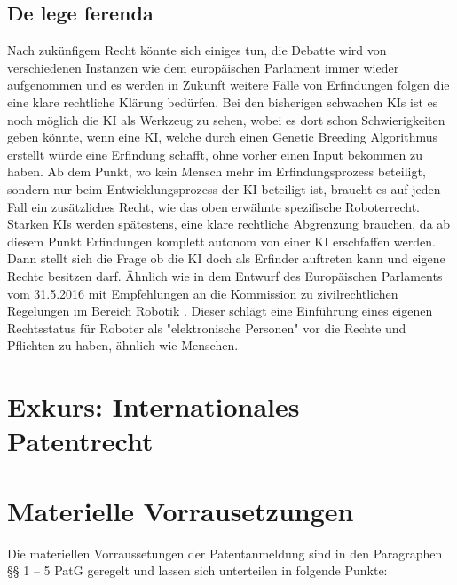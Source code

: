 \subsection{De lege ferenda}
Nach zukünfigem Recht könnte sich einiges tun, die Debatte wird von verschiedenen 
Instanzen wie dem europäischen Parlament immer wieder aufgenommen und es 
werden in Zukunft weitere Fälle von Erfindungen folgen die eine klare rechtliche 
Klärung bedürfen. 
Bei den bisherigen schwachen KIs ist es noch möglich die KI als Werkzeug
zu sehen, wobei es dort schon Schwierigkeiten geben könnte, wenn eine KI,
welche durch einen Genetic Breeding Algorithmus erstellt würde eine Erfindung
schafft, ohne vorher einen Input bekommen zu haben.
Ab dem Punkt, wo kein Mensch mehr im Erfindungsprozess beteiligt,
sondern nur beim Entwicklungsprozess der KI beteiligt ist,
braucht es auf jeden Fall ein zusätzliches Recht, wie das 
oben erwähnte spezifische Roboterrecht.
Starken KIs werden spätestens, eine klare rechtliche Abgrenzung 
brauchen, 
da ab diesem Punkt Erfindungen komplett autonom von einer KI erschfaffen werden.
Dann stellt sich die Frage ob die KI doch als Erfinder auftreten kann 
und eigene Rechte besitzen darf. Ähnlich wie in dem Entwurf des Europäischen
Parlaments vom 31.5.2016 mit Empfehlungen an die Kommission zu zivilrechtlichen Regelungen im
Bereich Robotik \cite{delvauxMitEmpfehlungenKommission}. Dieser schlägt 
eine Einführung eines eigenen Rechtsstatus 
für Roboter als "elektronische Personen" vor die Rechte und Pflichten zu haben, 
ähnlich wie Menschen.
\\
\section{Exkurs: Internationales Patentrecht\label{sec:intp}}
\section{Materielle Vorrausetzungen}

Die materiellen Vorraussetungen der Patentanmeldung sind 
in den Paragraphen §§ 1 – 5 PatG geregelt 
und lassen sich unterteilen in folgende Punkte:

